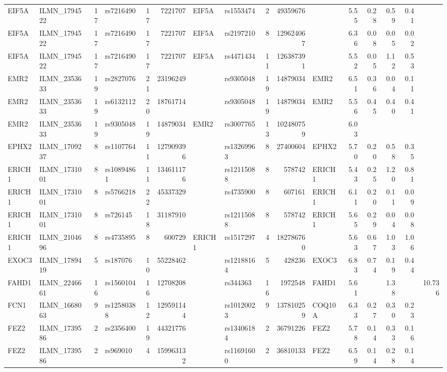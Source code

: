 \documentclass{article}
\begin{document}
\begin{landscape}
{\begin{ThreePartTable}
\begin{longtable}{|llr|lrrl|lrrl|rrrr|r|}
  EIF5A & ILMN\_1794522 & 17 & rs7216490 & 17 & 7221707 & EIF5A & rs1553474 & 2 & 49359676 &  & 5.55 & 0.28 & 0.59 & 0.41 &  \\
  EIF5A & ILMN\_1794522 & 17 & rs7216490 & 17 & 7221707 & EIF5A & rs2197210 & 8 & 129624067 &  & 6.36 & 0.08 & 0.05 & 0.02 &  \\
  EIF5A & ILMN\_1794522 & 17 & rs7216490 & 17 & 7221707 & EIF5A & rs4471434 & 11 & 126387391 &  & 5.52 & 0.05 & 1.12 & 0.53 &  \\
  EMR2 & ILMN\_2353633 & 19 & rs2827076 & 21 & 23196249 &  & rs9305048 & 19 & 14879034 & EMR2 & 6.51 & 0.36 & 0.04 & 0.11 &  \\
  EMR2 & ILMN\_2353633 & 19 & rs6132112 & 20 & 18761714 &  & rs9305048 & 19 & 14879034 & EMR2 & 5.56 & 0.45 & 0.40 & 0.41 &  \\
  EMR2 & ILMN\_2353633 & 19 & rs9305048 & 19 & 14879034 & EMR2 & rs3007765 & 13 & 102480759 &  & 6.03 &  &  &  &  \\
  EPHX2 & ILMN\_1709237 & 8 & rs1107764 & 11 & 127909396 &  & rs13269963 & 8 & 27400604 & EPHX2 & 5.70 & 0.20 & 0.58 & 0.35 &  \\
  ERICH1 & ILMN\_1731001 & 8 & rs10894861 & 11 & 134611176 &  & rs12115088 & 8 & 578742 & ERICH1 & 5.43 & 0.25 & 1.20 & 0.81 &  \\
  ERICH1 & ILMN\_1731001 & 8 & rs5766218 & 22 & 45337329 &  & rs4735900 & 8 & 607161 & ERICH1 & 6.11 & 0.20 & 0.11 & 0.09 &  \\
  ERICH1 & ILMN\_1731001 & 8 & rs726145 & 18 & 31187910 &  & rs12115088 & 8 & 578742 & ERICH1 & 5.65 & 0.29 & 0.04 & 0.08 &  \\
  ERICH1 & ILMN\_2104696 & 8 & rs4735895 & 8 & 600729 & ERICH1 & rs1517297 & 4 & 182786760 &  & 5.63 & 0.67 & 1.03 & 1.06 &  \\
  EXOC3 & ILMN\_1789419 & 5 & rs187076 & 10 & 55228462 &  & rs12188164 & 5 & 428236 & EXOC3 & 6.83 & 0.74 & 0.19 & 0.44 &  \\
  FAHD1 & ILMN\_2246661 & 16 & rs1560104 & 16 & 12708208 &  & rs344363 & 16 & 1972548 & FAHD1 & 5.61 &  & 1.38 &  & 10.736 \\
  FCN1 & ILMN\_1668063 & 9 & rs12580388 & 12 & 129591144 &  & rs10120023 & 9 & 137810259 & COQ10A & 6.33 & 0.27 & 0.30 & 0.23 &  \\
  FEZ2 & ILMN\_1739586 & 2 & rs2356400 & 19 & 44321776 &  & rs13406184 & 2 & 36791226 & FEZ2 & 5.78 & 0.14 & 0.33 & 0.16 &  \\
  FEZ2 & ILMN\_1739586 & 2 & rs969010 & 4 & 159963132 &  & rs11691600 & 2 & 36810133 & FEZ2 & 6.59 & 0.14 & 0.28 & 0.14 &  \\

\end{longtable}
\end{ThreePartTable}}
\end{landscape}
\end{document}
